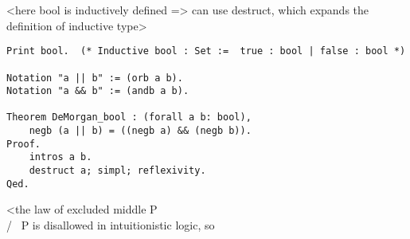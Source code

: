 \documentclass[article]{aaltoseries}
\begin{document}
<here bool is inductively defined => can use destruct, which expands the definition of inductive type>
\begin{lstlisting}[caption={Propositional logic proof: de Morgan's law for booleans},label={Coq:DeMorgan_bool}]
Print bool.  (* Inductive bool : Set :=  true : bool | false : bool *)

Notation "a || b" := (orb a b).
Notation "a && b" := (andb a b).

Theorem DeMorgan_bool : (forall a b: bool),
    negb (a || b) = ((negb a) && (negb b)).
Proof.
    intros a b.
    destruct a; simpl; reflexivity.
Qed.
\end{lstlisting}


<the law of excluded middle P \\/ ~P is disallowed in intuitionistic logic, so 















\end{document}
